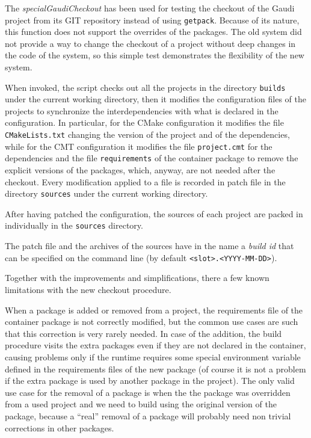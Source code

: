 \documentclass{lhcbnote}
\begin{document}
The \emph{specialGaudiCheckout} has been used for testing the checkout of the
Gaudi project from its GIT repository instead of using \texttt{getpack}.
Because of its nature, this function does not support the overrides of the
packages.  The old system did not provide a way to change the checkout of a
project without deep changes in the code of the system, so this simple test
demonstrates the flexibility of the new system.

When invoked, the script checks out all the projects in the directory
\texttt{builds} under the current working directory, then it modifies the
configuration files of the projects to synchronize the interdependencies with
what is declared in the configuration.  In particular, for the CMake
configuration it modifies the file \texttt{CMakeLists.txt} changing the version
of the project and of the dependencies, while for the CMT configuration it
modifies the file \texttt{project.cmt} for the dependencies and the file
\texttt{requirements} of the container package to remove the explicit versions
of the packages, which, anyway, are not needed after the checkout.  Every
modification applied to a file is recorded in patch file in the directory
\texttt{sources} under the current working directory.

After having patched the configuration, the sources of each project are packed
in individually in the \texttt{sources} directory.

The patch file and the archives of the sources have in the name a \emph{build
id} that can be specified on the command line (by default
\texttt{<slot>.<YYYY-MM-DD>}).

Together with the improvements and simplifications, there a few known
limitations with the new checkout procedure.

When a package is added or removed from a project, the requirements file of the
container package is not correctly modified, but the common use cases are such
that this correction is very rarely needed.  In case of the addition, the build
procedure visits the extra packages even if they are not declared in the
container, causing problems only if the runtime requires some special
environment variable defined in the requirements files of the new package (of
course it is not a problem if the extra package is used by another package in
the project).  The only valid use case for the removal of a package is when the
the package was overridden from a used project and we need to build using the
original version of the package, because a ``real'' removal of a package will
probably need non trivial corrections in other packages.
\end{document}
